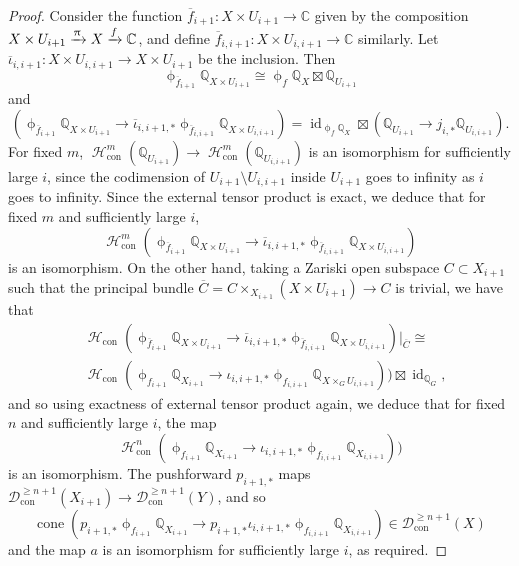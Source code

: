 \documentclass[a4paper,10pt]{amsart}
\renewcommand{\pi}{\uppi\hspace{0.05em}}
\renewcommand{\phi}{\upphi}
\DeclareMathOperator{\con}{con}
\DeclareMathOperator{\id}{id}
\DeclareMathOperator{\cone}{cone}
\DeclareMathOperator{\Ho}{\mathcal{H}}
\begin{document}
\begin{proof}
Consider the function $\overline{f}_{i+1}\colon X\times U_{i+1}\rightarrow \mathbb{C}$ given by the composition $X\times U_{i+1}\xrightarrow{\pi } X\xrightarrow{f}\mathbb{C}$, and define $\overline{f}_{i,i+1}\colon X\times U_{i,i+1}\rightarrow \mathbb{C}$ similarly.  Let $\overline{\iota}_{i,i+1}\colon  X\times U_{i,i+1}\rightarrow X\times U_{i+1}$ be the inclusion.  Then 
\[
\phi_{\overline{f}_{i+1}}\mathbb{Q}_{X\times U_{i+1}}\cong\phi_{f}\mathbb{Q}_{X}\boxtimes \mathbb{Q}_{U_{i+1}}
\]
and 
\[
\left(\phi_{\overline{f}_{i+1}}\mathbb{Q}_{X\times U_{i+1}}\rightarrow\overline{\iota}_{i,i+1,*}\phi_{\overline{f}_{i,i+1}}\mathbb{Q}_{X\times U_{i,i+1}}\right)=\id_{\phi_{f}\mathbb{Q}_{X}}\boxtimes (\mathbb{Q}_{U_{i+1}}\rightarrow j_{i,*}\mathbb{Q}_{U_{i,i+1}}).
\]
For fixed $m$, $\Ho_{\con}^m(\mathbb{Q}_{U_{i+1}})\rightarrow \Ho_{\con}^m(\mathbb{Q}_{U_{i,i+1}})$ is an isomorphism for sufficiently large $i$, since the codimension of $U_{i+1}\setminus U_{i,i+1}$ inside $U_{i+1}$ goes to infinity as $i$ goes to infinity.  Since the external tensor product is exact, we deduce that for fixed $m$ and sufficiently large $i$,
\[
\Ho^m_{\con}(\phi_{\overline{f}_{i+1}}\mathbb{Q}_{X\times U_{i+1}}\rightarrow\overline{\iota}_{i,i+1,*}\phi_{\overline{f}_{i,i+1}}\mathbb{Q}_{X\times U_{i,i+1}})
\]
is an isomorphism.  On the other hand, taking a Zariski open subspace $C\subset X_{i+1}$ such that the principal bundle $\overline{C}=C\times_{X_{i+1}}(X\times U_{i+1})\rightarrow C$ is trivial, we have that
\begin{align*}
&\Ho_{\con}(\phi_{\overline{f}_{i+1}}\mathbb{Q}_{X\times U_{i+1}}\rightarrow\overline{\iota}_{i,i+1,*}\phi_{\overline{f}_{i,i+1}}\mathbb{Q}_{X\times U_{i,i+1}})|_{\overline{C}}\cong\\& \Ho_{\con}(\phi_{f_{i+1}}\mathbb{Q}_{X_{i+1}}\rightarrow\iota_{i,i+1,*}\phi_{f_{i,i+1}}\mathbb{Q}_{X\times_{G} U_{i,i+1}}))\boxtimes\id_{\mathbb{Q}_{G}},
\end{align*}
and so using exactness of external tensor product again, we deduce that for fixed $n$ and sufficiently large $i$, the map 
\[
\Ho^n_{\con}(\phi_{f_{i+1}}\mathbb{Q}_{X_{i+1}}\rightarrow\iota_{i,i+1,*}\phi_{f_{i,i+1}}\mathbb{Q}_{X_{i,i+1}}))
\]
is an isomorphism.  The pushforward $p_{i+1,*}$ maps $\mathcal{D}_{\con}^{\geq n+1}(X_{i+1})\rightarrow \mathcal{D}_{\con}^{\geq n+1}(Y)$, and so 
\[
\cone\left(p_{i+1,*}\phi_{f_{i+1}}\mathbb{Q}_{X_{i+1}}\rightarrow p_{i+1,*}\iota_{i,i+1,*}\phi_{f_{i,i+1}}\mathbb{Q}_{X_{i,i+1}}\right)\in\mathcal{D}_{\con}^{\geq n+1}(X)
\]
and the map $a$ is an isomorphism for sufficiently large $i$, as required.
\end{proof}
\end{document}
